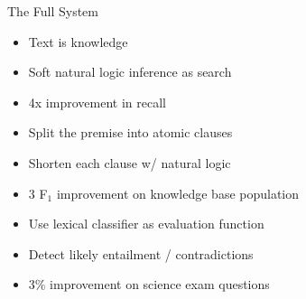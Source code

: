 \def\title{The Full System}
%
%
%
%

%
%
\begin{frame}[noframenumbering]{\title}

\begin{itemize}
\item Text is knowledge
\item Soft natural logic inference as search
\item 4x improvement in recall
\end{itemize}
\vspace{1ex}
\pause

\begin{itemize}
\item Split the premise into atomic clauses
\item Shorten each clause w/ natural logic
\item 3 F$_1$ improvement on knowledge base population
\end{itemize}
\vspace{1ex}
\pause

\begin{itemize}
\item Use lexical classifier as evaluation function
\item Detect likely entailment / contradictions
\item 3\% improvement on science exam questions
\end{itemize}
\end{frame}



